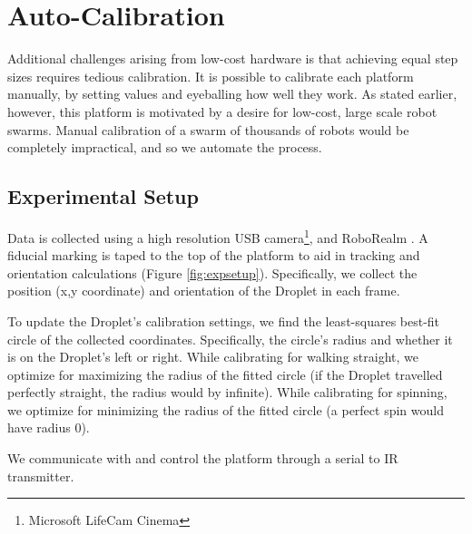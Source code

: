 \documentclass[letterpaper, 10pt, conference]{ieeeconf}
\begin{document}
\section{Auto-Calibration}
Additional challenges arising from low-cost hardware is that achieving equal step sizes requires tedious calibration.
It is possible to calibrate each platform manually, by setting values and eyeballing how well they work. As stated earlier, however, this platform is motivated by a desire for low-cost, large scale robot swarms.  Manual calibration of a swarm of thousands of robots would be completely impractical, and so we automate the process.

\subsection{Experimental Setup}
Data is collected using a high resolution USB camera\footnote{Microsoft LifeCam Cinema}, and RoboRealm \cite{RoboRealm}. A fiducial marking is taped to the top of the platform to aid in tracking and orientation calculations (Figure \ref{fig:expsetup}). Specifically, we collect the position (x,y coordinate) and orientation of the Droplet in each frame.

To update the Droplet's calibration settings, we find the least-squares best-fit circle of the collected coordinates. Specifically, the circle's radius and whether it is on the Droplet's left or right. While calibrating for walking straight, we optimize for maximizing the radius of the fitted circle (if the Droplet travelled perfectly straight, the radius would by infinite). While calibrating for spinning, we optimize for minimizing the radius of the fitted circle (a perfect spin would have radius 0).

We communicate with and control the platform through a serial to IR transmitter. 
\end{document}

